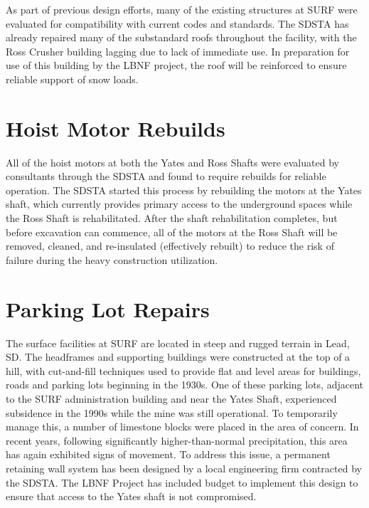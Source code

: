As part of previous design efforts, many of the existing structures at SURF were evaluated for compatibility with current codes and standards.  The SDSTA has already repaired many of the substandard roofs throughout the facility, with the Ross Crusher building lagging due to lack of immediate use.  In preparation for use of this building by the LBNF project, the roof will be reinforced to ensure reliable support of snow loads.
 
\section{Hoist Motor Rebuilds}
\label{ch:fscf-site-prep-motor}

All of the hoist motors at both the Yates and Ross Shafts were evaluated by consultants through the SDSTA and found to require rebuilds for reliable operation.  The SDSTA started this process by rebuilding the motors at the Yates shaft, which currently provides primary access to the underground spaces while the Ross Shaft is rehabilitated.  After the shaft rehabilitation completes, but before excavation can commence, all of the motors at the Ross Shaft will be removed, cleaned, and re-insulated (effectively rebuilt) to reduce the risk of failure during the heavy construction utilization.
 
\section{Parking Lot Repairs}
\label{ch:fscf-site-prep-parking}

The surface facilities at SURF are located in steep and rugged terrain in Lead, SD.  The headframes and supporting buildings were constructed at the top of a hill, with cut-and-fill techniques used to provide flat and level areas for buildings, roads and parking lots beginning in the 1930s.  One of these parking lots, adjacent to the SURF administration building and near the Yates Shaft, experienced subsidence in the 1990s while the mine was still operational.  To temporarily manage this, a number of limestone blocks were placed in the area of concern.  In recent years, following significantly higher-than-normal precipitation, this area has again exhibited signs of movement.  To address this issue, a permanent retaining wall system has been designed by a local engineering firm contracted by the SDSTA.  The LBNF Project has included budget to implement this design to ensure that access to the Yates shaft is not compromised.
 